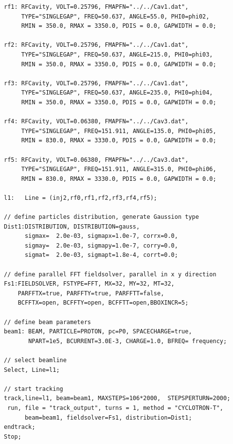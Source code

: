 \begin{fmpage}
\begin{footnotesize}
\begin{verbatim}
rf1: RFCavity, VOLT=0.25796, FMAPFN="../../Cav1.dat", 
     TYPE="SINGLEGAP", FREQ=50.637, ANGLE=55.0, PHI0=phi02, 
     RMIN = 350.0, RMAX = 3350.0, PDIS = 0.0, GAPWIDTH = 0.0;

rf2: RFCavity, VOLT=0.25796, FMAPFN="../../Cav1.dat", 
     TYPE="SINGLEGAP", FREQ=50.637, ANGLE=215.0, PHI0=phi03, 
     RMIN = 350.0, RMAX = 3350.0, PDIS = 0.0, GAPWIDTH = 0.0;

rf3: RFCavity, VOLT=0.25796, FMAPFN="../../Cav1.dat", 
     TYPE="SINGLEGAP", FREQ=50.637, ANGLE=235.0, PHI0=phi04,
     RMIN = 350.0, RMAX = 3350.0, PDIS = 0.0, GAPWIDTH = 0.0;

rf4: RFCavity, VOLT=0.06380, FMAPFN="../../Cav3.dat", 
     TYPE="SINGLEGAP", FREQ=151.911, ANGLE=135.0, PHI0=phi05,
     RMIN = 830.0, RMAX = 3330.0, PDIS = 0.0, GAPWIDTH = 0.0;

rf5: RFCavity, VOLT=0.06380, FMAPFN="../../Cav3.dat", 
     TYPE="SINGLEGAP", FREQ=151.911, ANGLE=315.0, PHI0=phi06, 
     RMIN = 830.0, RMAX = 3330.0, PDIS = 0.0, GAPWIDTH = 0.0;

l1:   Line = (inj2,rf0,rf1,rf2,rf3,rf4,rf5);

// define particles distribution, generate Gaussion type
Dist1:DISTRIBUTION, DISTRIBUTION=gauss,
      sigmax=  2.0e-03, sigmapx=1.0e-7, corrx=0.0,
      sigmay=  2.0e-03, sigmapy=1.0e-7, corry=0.0,
      sigmat=  2.0e-03, sigmapt=1.8e-4, corrt=0.0;

// define parallel FFT fieldsolver, parallel in x y direction
Fs1:FIELDSOLVER, FSTYPE=FFT, MX=32, MY=32, MT=32, 
    PARFFTX=true, PARFFTY=true, PARFFTT=false,
    BCFFTX=open, BCFFTY=open, BCFFTT=open,BBOXINCR=5;

// define beam parameters
beam1: BEAM, PARTICLE=PROTON, pc=P0, SPACECHARGE=true,
       NPART=1e5, BCURRENT=3.0E-3, CHARGE=1.0, BFREQ= frequency;

// select beamline
Select, Line=l1;

// start tracking
track,line=l1, beam=beam1, MAXSTEPS=106*2000,  STEPSPERTURN=2000;
 run, file = "track_output", turns = 1, method = "CYCLOTRON-T", 
      beam=beam1, fieldsolver=Fs1, distribution=Dist1;
endtrack;
Stop;
\end{verbatim}
\end{footnotesize}
\end{fmpage}

